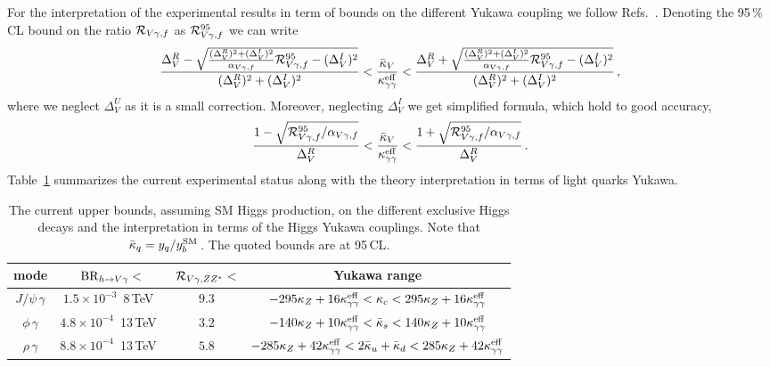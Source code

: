 \documentclass[../report.tex]{subfiles}
\begin{document}
For the interpretation of the experimental results in term of bounds on the different Yukawa coupling we follow Refs.~\cite{Perez:2015aoa,Perez:2015lra}. 
Denoting the 95\,\%\,CL bound on the ratio $\mathcal{R}_{V\gamma,f}$ as $\mathcal{R}_{V\gamma,f}^{95}$ we can write 
%
\begin{align}
	\frac{\Delta^R_V - \sqrt{  \frac{(\Delta^R_V)^2 + (\Delta^I_V)^2    }{\alpha_{V\gamma,f}} \mathcal{R}_{V\gamma,f}^{95}   - (\Delta^I_V)^2 } }{ (\Delta^R_V)^2 + (\Delta^I_V)^2 } 
	< \frac{\bar{\kappa}_V}{\kappa^{\rm eff}_{\gamma\gamma}} < 
	\frac{\Delta^R_V + \sqrt{  \frac{(\Delta^R_V)^2 + (\Delta^I_V)^2    }{\alpha_{V\gamma,f}} \mathcal{R}_{V\gamma,f}^{95}   - (\Delta^I_V)^2 } }{ (\Delta^R_V)^2 + (\Delta^I_V)^2 }  \, ,
\end{align}
%
where we neglect $\Delta^U_V$ as it is a small correction. 
Moreover, neglecting $\Delta^I_V$ we get simplified formula, which hold to good accuracy, 
%
\begin{align}
	\label{eq:Rsimp}
	\frac{1 - \sqrt{  \mathcal{R}_{V\gamma,f}^{95}/\alpha_{V\gamma,f} } }{ \Delta^R_V} 
	< \frac{\bar{\kappa}_V}{\kappa^{\rm eff}_{\gamma\gamma}} < 
	\frac{1 + \sqrt{  \mathcal{R}_{V\gamma,f}^{95}/\alpha_{V\gamma,f} } }{ \Delta^R_V}  \, .
\end{align}
%
Table~\ref{tab:hexclusive} summarizes the current experimental status along with the theory interpretation in terms of light quarks Yukawa.  
\begin{table}[t]
\begin{center}
\begin{tabular}{|c|c|c|c|}
\hline
mode & ${\rm BR}_{h\to V\gamma}<$ & $\mathcal{R}_{V\gamma,ZZ^*}<$ &Yukawa range  \\
\hline\hline 
$J/\psi\,\gamma$  &
$1.5\times 10^{-3}$\, 8\,TeV~\cite{Aad:2015sda,Khachatryan:2015lga} & 
$9.3$ &
$-295\kappa_Z + 16\kappa^{\rm eff}_{\gamma\gamma} < \kappa_c < 295\kappa_Z + 16\kappa^{\rm eff}_{\gamma\gamma} $\\
\hline
$\phi\,\gamma$ &
$4.8 \times 10^{-4}$\, 13\,TeV~\cite{Aaboud:2016rug,Aaboud:2017xnb} & 
$3.2$ &
$-140\kappa_Z + 10\kappa^{\rm eff}_{\gamma\gamma} < \bar{\kappa}_s < 140\kappa_Z + 10\kappa^{\rm eff}_{\gamma\gamma} $\\
\hline
$\rho\,\gamma$ &
$8.8 \times 10^{-4}$\, 13\,TeV~\cite{Aaboud:2017xnb} & 
$5.8$ &
$-285\kappa_Z + 42\kappa^{\rm eff}_{\gamma\gamma} < 2\bar{\kappa}_u + \bar{\kappa}_d < 285\kappa_Z + 42\kappa^{\rm eff}_{\gamma\gamma} $\\
\hline\hline
\end{tabular}
\end{center}
\caption{The current upper bounds, assuming SM Higgs production, on the different exclusive Higgs decays and the interpretation in terms of the Higgs Yukawa couplings. Note that $\bar{\kappa}_q = y_q/y^{\rm SM}_b\,$. The quoted bounds are at 95\,CL. }
\label{tab:hexclusive}
\end{table}%
\end{document}

